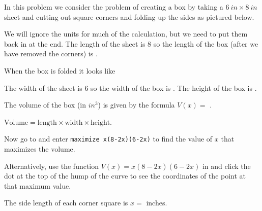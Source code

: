 \documentclass{ximera}
\begin{document}
\begin{question}
In this problem we consider the problem of creating a box by taking a $\SI{6}{in}\times\SI{8}{in}$ sheet and cutting out square corners and folding up the sides as pictured below.
\begin{image}
\end{image}

We will ignore the units for much of the calculation, but we need to put them back in at the end. The length of the sheet is $8$ so the length of the box (after we have removed the corners) is .
\begin{hint}
When the box is folded it looks like
\begin{image}
\end{image}
\end{hint}
The width of the sheet is $6$ so the width of the box is . The height of the box is . 

The volume of the box (in $\si{in^3}$) is given by the formula $V(x)=$ .
\begin{hint}
$\text{Volume}=\text{length}\times\text{width}\times\text{height}$.
\end{hint}

Now go to  and enter \texttt{maximize x(8-2x)(6-2x)} to find the value of $x$ that maximizes the volume. 

Alternatively, use the function $V(x)=x(8-2x)(6-2x)$ in  and click the dot at the top of the hump of the curve to see the coordinates of the point at that maximum value.

The side length of each corner square is  $x=$  inches.

\end{question}
\end{document}
